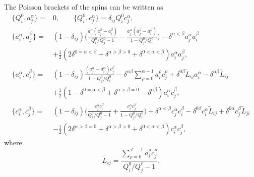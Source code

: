 \begin{prop}
    The Poisson brackets of the spins can be written as
    \begin{align}
        \{ Q_i^0, a_j^\alpha \} ={}& 0, \qquad \{ Q_i^0, c_j^\alpha \} = \delta_{ij} Q_i^0 c_j^\alpha, \\[4pt]
        \{ a_i^\alpha,a_j^\beta \} ={}& (1-\delta_{ij}) \bigg( \frac{a_i^\alpha (a_j^\beta-a_i^\beta)}{Q_i^0/Q_j^0-1} - \frac{a_j^\alpha (a_j^\beta-a_i^\beta)}{1-Q_j^0/Q_i^0} \bigg) - \delta^{\alpha < \beta} a_j^\alpha a_i^\beta \\
        &+ \tfrac{1}{2} (2\delta^{0=\alpha<\beta} + \delta^{\alpha>\beta>0} + \delta^{0 < \alpha < \beta}) a_i^\alpha a_j^\beta, \nonumber
        \\[4pt]
        \{ a_i^\alpha,c_j^\beta \} ={}& (1-\delta_{ij}) \frac{(a_j^\alpha-a_i^\alpha) c_j^\beta}{1-Q_j^0/Q_i^0} - \delta^{\alpha\beta} \sum_{\rho=0}^{\alpha-1} a_i^\rho c_j^\rho + \delta^{0\beta} \tilde L_{ij} a_i^\alpha - \delta^{\alpha\beta} \tilde L_{ij} \\
        &+ \tfrac{1}{2}(1 - \delta^{0=\alpha < \beta} + \delta^{\alpha > \beta=0}-\delta^{\alpha\beta}) a_i^\alpha c_j^\beta, \nonumber
        \\[4pt]
        \{ c_i^\alpha,c_j^\beta \} ={}& (1-\delta_{ij}) \bigg( \frac{c_j^\alpha c_i^\beta}{Q_i^0/Q_j^0-1} + \frac{c_i^\alpha c_j^\beta}{1-Q_j^0/Q_i^0} \bigg) + \delta^{\alpha < \beta} c_j^\alpha c_i^\beta - \delta^{0\beta} c_i^\alpha \tilde L_{ij} + \delta^{0\alpha} c_j^\beta \tilde L_{ji} \\
        &- \tfrac{1}{2} (2 \delta^{\alpha > \beta=0} + \delta^{\alpha > \beta > 0} + \delta^{0<\alpha<\beta}) c_i^\alpha c_j^\beta, \nonumber
    \end{align}
    where
    \begin{equation}
        \tilde L_{ij} = \frac{\sum_{\rho=0}^{\ell-1} a_i^\rho c_j^\rho}{Q_i^0/Q_j^\ell-1}.
    \end{equation}
\end{prop}

